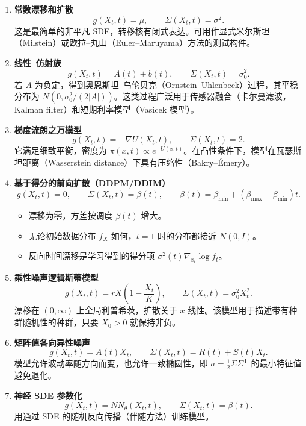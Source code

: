 \begin{enumerate}
  \item \textbf{常数漂移和扩散}
  \[
    g(X_t,t)=\mu,\qquad \Sigma(X_t,t)=\sigma^2.
  \]
  这是最简单的非平凡 SDE，转移核有闭式表达。可用作显式米尔斯坦（Milstein）或欧拉–丸山（Euler–Maruyama）方法的测试构件。

  \item \textbf{线性–仿射族}
  \[
    g(X_t,t)=A(t)+b(t),\qquad \Sigma(X_t,t)=\sigma_0^2.
  \]
  若 $A$ 为负定，得到奥恩斯坦–乌伦贝克（Ornstein–Uhlenbeck）过程，其平稳分布为
  $N(0,\sigma_0^2/(2|A|))$。这类过程广泛用于传感器融合（卡尔曼滤波，Kalman filter）和短期利率模型（Vasicek 模型）。

  \item \textbf{梯度流朗之万模型}
  \[
    g(X_t,t)=-\nabla U(X_t,t),\qquad \Sigma(X_t,t)=2.
  \]
  它满足细致平衡，密度为 $\pi(x,t)\propto e^{-U(x,t)}$。在凸性条件下，模型在瓦瑟斯坦距离（Wasserstein distance）下具有压缩性（Bakry–Émery）。

  \item \textbf{基于得分的前向扩散（DDPM/DDIM）}
  \[
    g(X_t,t)=0,\qquad \Sigma(X_t,t)=\beta(t),\qquad
    \beta(t)=\beta_{\min}+(\beta_{\max}-\beta_{\min})t.
  \]
  \begin{itemize}
    \item 漂移为零，方差按调度 $\beta(t)$ 增大。
    \item 无论初始数据分布 $f_X$ 如何，$t=1$ 时的分布都接近 $N(0,I)$。
    \item 反向时间漂移是学习得到的得分项 $\sigma^2(t)\nabla_{x_t}\log f_t$。
  \end{itemize}

  \item \textbf{乘性噪声逻辑斯蒂模型}
  \[
    g(X_t,t)=rX\left(1-\frac{X_t}{K}\right),\qquad
    \Sigma(X_t,t)=\sigma_0^2X_t^2.
  \]
  漂移在 $(0,\infty)$ 上全局利普希茨，扩散关于 $x$ 线性。该模型用于描述带有种群随机性的种群，只要 $X_0>0$ 就保持非负。

  \item \textbf{矩阵值各向异性噪声}
  \[
    g(X_t,t)=A(t)X_t,\qquad \Sigma(X_t,t)=R(t)+S(t)X_t.
  \]
  模型允许波动率随方向而变，也允许一致椭圆性，即 $a=\tfrac12\Sigma\Sigma^{\mathsf T}$ 的最小特征值避免退化。

  \item \textbf{神经 SDE 参数化}
  \[
    g(X_t,t)=NN_\theta(X_t,t),\qquad \Sigma(X_t,t)=\beta(t).
  \]
  用通过 SDE 的随机反向传播（伴随方法）训练模型。
\end{enumerate}

